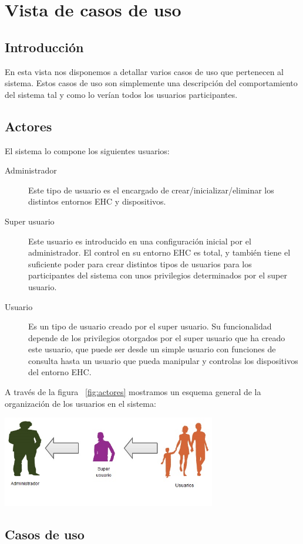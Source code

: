\chapter{Vista de casos de uso}
\section{Introducción}
En esta vista nos disponemos a detallar varios casos de uso que pertenecen al sistema. Estos casos de uso son simplemente una descripción del comportamiento del sistema tal y como lo verían todos los usuarios participantes.

\section{Actores}
El sistema lo compone los siguientes usuarios:
\begin{description}
\item[Administrador] Este tipo de usuario es el encargado de crear/inicializar/eliminar los distintos entornos EHC y dispositivos.
\item[Super usuario] Este usuario es introducido en una configuración inicial por el administrador. El control en su entorno EHC es total, y también tiene el suficiente poder para crear distintos tipos de usuarios para los participantes del sistema con unos privilegios determinados por el super usuario. 
\item[Usuario] Es un tipo de usuario creado por el super usuario. Su funcionalidad depende de los privilegios otorgados por el super usuario que ha creado este usuario, que puede ser desde un simple usuario con funciones de consulta hasta un usuario que pueda manipular y controlas los dispositivos del entorno EHC.
\end{description}

A través de la figura ~\ref{fig:actores} mostramos un esquema general de la organización de los usuarios en el sistema:

\includegraphics[width=0.7\textwidth]{4.Disenio/Imagenes/Actores}


\section{Casos de uso}
